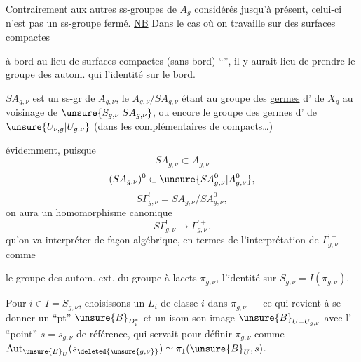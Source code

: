 Contrairement aux autres ss-groupes de $A_g$ considérés jusqu'à présent, celui-ci n'est pas un ss-groupe fermé. \uline{NB} Dans le cas où on travaille sur des surfaces compactes

à bord au lieu de surfaces compactes (sans bord) ``'', il y aurait lieu de prendre le groupe des autom. qui  l'identité sur le bord.

$SA_{g,\nu}$ est un ss-gr  de $A_{g,\nu}$, le  $A_{g,\nu}/SA_{g,\nu}$ étant  au groupe des \uline{germes} d' de $X_g$ au voisinage de $\unsure{S_{g,\nu}|SA_{g,\nu}}$, ou encore le groupe des germes  d' de $\unsure{U_{\nu,g}|U_{g,\nu}}$ (dans les complémentaires de compacts\ldots)

  évidemment, puisque
\[
SA_{g,\nu}\subset A_{g,\nu}
\]
\[
(SA_{g,\nu})^{0}\subset \unsure{SA_{g,\nu}^{0}|A_{g,\nu}^{0}},
\]
\[
S\Gamma_{g,\nu}^{!}=SA_{g,\nu}/SA_{g,\nu}^{0},
\]
on aura un homomorphisme canonique
\[
S\Gamma_{g,\nu}^{!}\longrightarrow\Gamma_{g,\nu}^{!+}.
\]
qu'on va interpréter de façon algébrique, en termes de l'interprétation de $\Gamma_{g,\nu}^{!+}$ \inserted{$=\Gamma^{!}$} comme

le groupe des autom. ext. du groupe à lacets $\pi_{g,\nu}$,  l'identité sur $S_{g,\nu}=I(\pi_{g,\nu})$.

  Pour $i\in I=S_{g,\nu}$, choisissons un \deleted{$\unsure{\ell}$} $L_i$ de classe $i$ dans $\pi_{g,\nu}$ --- ce qui revient à se donner un ``pt''  $\unsure{B}_{D_i^{*}}$   et un isom  son image  $\unsure{B}_{U=U_{g,\nu}}$ avec l' ``point'' $s=s_{g,\nu}$ de référence, qui servait pour définir $\pi_{g,\nu}$ comme $\operatorname{Aut}_{\unsure{B}_U}(s_{\deleted{\unsure{g,\nu}}})\simeq\pi_1(\unsure{B}_U,s)$.

